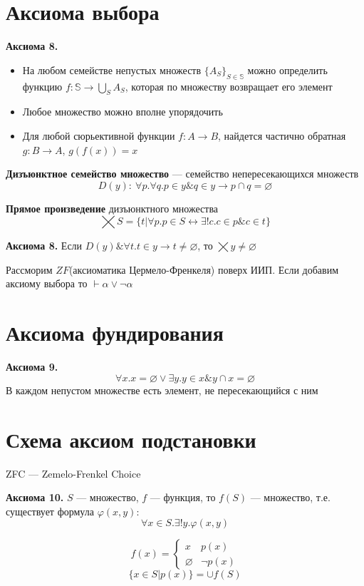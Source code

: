 \documentclass[oneside]{book}
\begin{document}
\section{Аксиома выбора}
\label{sec:org2d298d4}
\begin{axiom*}{\bf Аксиома 8.}
	\begin{itemize}
		\item На любом семействе непустых множеств \(\{A_S\}_{S \in \mathbb{S}}\) можно определить функцию \(f: \mathbb{S} \to \bigcup_{S}A_S\), которая по множеству возвращает его элемент
		\item Любое множество можно вполне упорядочить
		\item Для любой сюрьективной функции \(f: A \to B\), найдется частично обратная \(g: B \to A\), \(g(f(x)) = x\)
	\end{itemize}
\end{axiom*}
\begin{definition}
	\textbf{Дизъюнктное семейство множество} --- семейство непересекающихся множеств
	\[ D(y):\ \forall p.\forall q. p \in y \& q \in y \to p \cap q = \varnothing \]
\end{definition}
\begin{definition}
	\textbf{Прямое произведение} дизъюнктного множества
	\[ \bigtimes S = \{t \big| \forall p. p \in S \leftrightarrow \exists ! c. c \in p \& c \in t\} \]
\end{definition}
\begin{axiom*}{\bf Аксиома 8.}
	Если \(D(y)\& \forall t. t \in y \to t \neq \varnothing\), то \(\bigtimes y \neq \varnothing\)
	\label{orge4b8e5a}
\end{axiom*}
\begin{theorem}[Диаконеску]
	Рассморим \(ZF\)(аксиоматика Цермело-Френкеля) поверх ИИП. Если добавим аксиому выбора то \(\vdash \alpha \lor \lnot \alpha\)
	\label{org0ffb8fb}
\end{theorem}
\section{Аксиома фундирования}
\label{sec:orga87c07f}
\begin{axiom*}{\bf Аксиома 9.}
	\[ \forall x. x = \varnothing \lor \exists y. y \in x \& y \cap x = \varnothing \]
	В каждом непустом множестве есть элемент, не пересекающийся с ним
\end{axiom*}
\section{Схема аксиом подстановки}
\label{sec:orgb7b8405}
ZFC --- Zemelo-Frenkel Choice \\
\begin{axiom*}{\bf Аксиома 10.}
	\(S\) --- множество, \(f\) --- функция, то \(f(S)\) --- множество, т.е. существует формула \(\varphi(x, y)\):
	\[\forall x \in S. \exists ! y. \varphi(x, y)\]
\end{axiom*}
\begin{examp}
	\[ f(x) = \begin{cases} {x} & p(x) \\ \varnothing & \neg p(x) \end{cases} \]
	\[ \{x \in S | p(x)\} = \cup f(S) \]
\end{examp}
\end{document}
